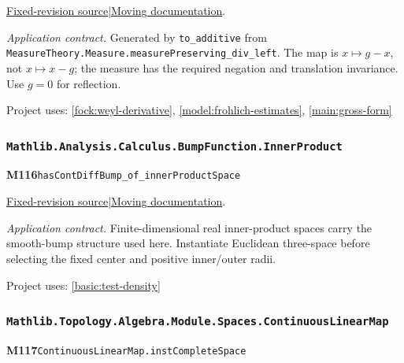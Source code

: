 \documentclass[11pt,a4paper]{article}
\theoremstyle{definition}
\theoremstyle{remark}
\begin{document}
\href{https://github.com/leanprover-community/mathlib4/blob/9bac2d0692944a775113f7c130fd5e5b4608a854/Mathlib/MeasureTheory/Group/Measure.lean}{Fixed-revision source}\quad|\quad\href{https://leanprover-community.github.io/mathlib4_docs/Mathlib/MeasureTheory/Group/Measure.html#MeasureTheory.Measure.measurePreserving_sub_left}{Moving documentation}.\par
\noindent\textit{Application contract.} Generated by \nolinkurl{to_additive} from \nolinkurl{MeasureTheory.Measure.measurePreserving_div_left}. The map is $x\mapsto g-x$, not $x\mapsto x-g$; the measure has the required negation and translation invariance. Use $g=0$ for reflection.\par
{\small Project uses: \ref{fock:weyl-derivative}, \ref{model:frohlich-estimates}, \ref{main:gross-form}}\par\medskip

\subsubsection*{\nolinkurl{Mathlib.Analysis.Calculus.BumpFunction.InnerProduct}}
\noindent\textbf{M116}\label{base:M116}\quad\nolinkurl{hasContDiffBump_of_innerProductSpace}

\href{https://github.com/leanprover-community/mathlib4/blob/9bac2d0692944a775113f7c130fd5e5b4608a854/Mathlib/Analysis/Calculus/BumpFunction/InnerProduct.lean}{Fixed-revision source}\quad|\quad\href{https://leanprover-community.github.io/mathlib4_docs/Mathlib/Analysis/Calculus/BumpFunction/InnerProduct.html#hasContDiffBump_of_innerProductSpace}{Moving documentation}.\par
\noindent\textit{Application contract.} Finite-dimensional real inner-product spaces carry the smooth-bump structure used here. Instantiate Euclidean three-space before selecting the fixed center and positive inner/outer radii.\par
{\small Project uses: \ref{basic:test-density}}\par\medskip

\subsubsection*{\nolinkurl{Mathlib.Topology.Algebra.Module.Spaces.ContinuousLinearMap}}
\noindent\textbf{M117}\label{base:M117}\quad\nolinkurl{ContinuousLinearMap.instCompleteSpace}
\end{document}
